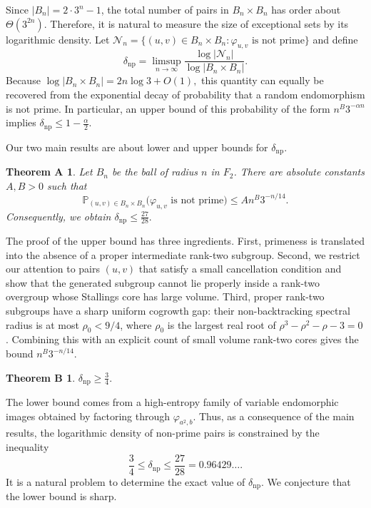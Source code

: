 \documentclass{amsproc}
\newtheorem*{theoremA}{Theorem A}
\newtheorem*{theoremB}{Theorem B}
\newcommand{\Prob}{\mathbb P}
\begin{document}
Since $|B_n|=2\cdot 3^n-1$, the total number of pairs in $B_n\times B_n$ has
order about $\Theta(3^{2n})$.  Therefore, it is natural to measure the size of exceptional sets
by its logarithmic density.  Let
$
        \mathcal N_n=
        \{(u,v)\in B_n\times B_n:\varphi_{u,v}\text{ is not prime}\}
$
and define
\[
        \delta_{\mathrm{np}}=
        \limsup_{n\to\infty}\frac{\log |\mathcal N_n|}{\log |B_n\times B_n|}.
\]
Because
$
        \log |B_n\times B_n|=2n\log 3+O(1),
$
this quantity can equally be recovered from the exponential decay of probability that a random endomorphism is not prime.
In particular, an upper bound of this probability of the form $n^B3^{-\alpha n}$ implies
$
        \delta_{\mathrm{np}}\leq 1-\frac{\alpha}{2}.
$

\medskip

Our two main results are about lower and upper bounds for $\delta_{\mathrm{np}}$.

\begin{theoremA}
Let $B_n$ be the ball of radius $n$ in $F_2$. There are absolute constants
$A,B>0$ such that
\[
        \Prob_{(u,v)\in B_n\times B_n}
        \bigl(\varphi_{u,v}\text{ is not prime}\bigr)
        \leq A n^B3^{-n/14}.
\]
Consequently, we obtain
$
        \delta_{\mathrm{np}}\leq \frac{27}{28}.
$
\end{theoremA}

The proof of the upper bound has three ingredients. First, primeness is
translated into the absence of a proper intermediate rank-two subgroup. Second, we restrict our attention to pairs $(u,v)$ that satisfy a small cancellation condition and show that the generated subgroup cannot lie properly inside a rank-two overgroup whose Stallings core has large volume. Third, proper rank-two subgroups have a
sharp uniform cogrowth gap: their non-backtracking spectral radius is at most
$\rho_0<9/4$, where $\rho_0$ is the largest real root of
$\rho^3-\rho^2-\rho-3=0$.  Combining this with an explicit count of small volume
rank-two cores gives the bound $n^B3^{-n/14}$.

\begin{theoremB}

$
        \delta_{\mathrm{np}}\geq \frac34.
$
\end{theoremB}

The lower bound comes from a high-entropy family of variable endomorphic images
obtained by factoring through $\varphi_{a^2,b}$.
Thus, as a consequence of the main results, the logarithmic density of non-prime pairs is constrained by the inequality
\[
        \frac34
        \leq \delta_{\mathrm{np}}
        \leq \frac{27}{28}=0.96429 \dots.
\]
It is a natural problem to determine the exact value of $\delta_{\mathrm{np}}$. We conjecture that the lower bound is sharp.
\end{document}

